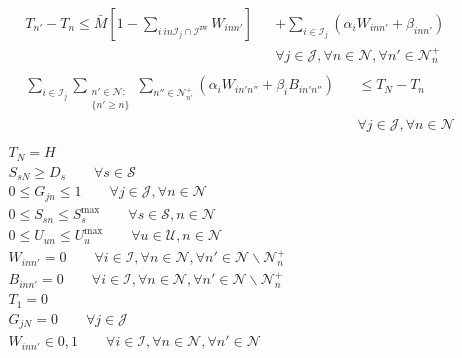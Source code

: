 \begin{align}
&\begin{aligned}
	&T_{n'} - T_{n} \le \bar{M} \left[ 1 - \sum_{i \ in \mathcal{I}_j \cap \mathcal{I}^{\text{zw}}} W_{inn'} \right] &&+ \sum_{i \in \mathcal{I}_j} \left( \alpha_i W_{inn'} + \beta_{inn'} \right) \\ & && \forall j \in \mathcal{J}, \forall n \in \mathcal{N}, \forall n' \in \mathcal{N}_{n} ^{+}
\end{aligned} \\
&\begin{aligned}
	&\sum_{i \in \mathcal{I}_j} \sum_{\substack{n' \in \mathcal{N} : \\ \{ n' \ge n\}}} \sum_{n'' \in \mathcal{N}_{n'}^{+}} \left(\alpha_i W_{in'n''} + \beta_i B_{in'n''} \right) &&\le T_N - T_n  \\ & &&\forall j \in \mathcal{J}, \forall n \in \mathcal{N} \\
\end{aligned} \\
	&T_N = H &&\\
	& S_{sN} \ge D_s  \qquad \forall s \in \mathcal{S} && \\
	& 0 \le G_{jn} \le 1 \qquad \forall j \in \mathcal{J}, \forall n \in \mathcal{N} && \\
	& 0 \le S_{sn} \le S_{s}^{\text{max}} \qquad \forall s \in \mathcal{S}, n \in \mathcal{N} && \\
	& 0 \le U_{un} \le U_{u}^{\text{max}} \qquad \forall u \in \mathcal{U}, n \in \mathcal{N} && \\
	& W_{inn'} = 0 \qquad \forall i \in \mathcal{I}, \forall n \in \mathcal{N}, \forall n' \in \mathcal{N} \backslash \mathcal{N}_{n}^+ &&\\
	& B_{inn'} = 0 \qquad \forall i \in \mathcal{I}, \forall n \in \mathcal{N}, \forall n' \in \mathcal{N} \backslash \mathcal{N}_{n}^+ &&\\
	& T_1 = 0 && \\
	& G_{jN} = 0 \qquad \forall j \in \mathcal{J} &&\\
	& W_{inn'} \in {0,1} \qquad \forall i \in \mathcal{I}, \forall n \in \mathcal{N}, \forall n' \in \mathcal{N} &&
\end{align}

